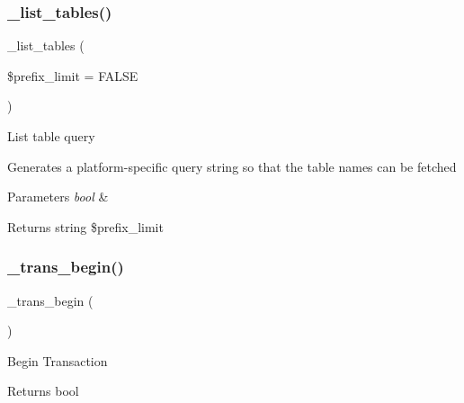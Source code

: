 \subsubsection{\texorpdfstring{\+\_\+list\+\_\+tables()}{\_list\_tables()}}
{\footnotesize\ttfamily \+\_\+list\+\_\+tables (\begin{DoxyParamCaption}\item[{}]{\$prefix\+\_\+limit = {\ttfamily FALSE} }\end{DoxyParamCaption})\hspace{0.3cm}{\ttfamily [protected]}}

List table query

Generates a platform-\/specific query string so that the table names can be fetched


\begin{DoxyParams}{Parameters}
{\em bool} & \\
\hline
\end{DoxyParams}
\begin{DoxyReturn}{Returns}
string \$prefix\+\_\+limit 
\end{DoxyReturn}
\mbox{\label{class_c_i___d_b__sqlsrv__driver_ac81ac882c1d54347d810199a15856aac}} 
\subsubsection{\texorpdfstring{\+\_\+trans\+\_\+begin()}{\_trans\_begin()}}
{\footnotesize\ttfamily \+\_\+trans\+\_\+begin (\begin{DoxyParamCaption}{ }\end{DoxyParamCaption})\hspace{0.3cm}{\ttfamily [protected]}}

Begin Transaction

\begin{DoxyReturn}{Returns}
bool 
\end{DoxyReturn}
\mbox{\label{class_c_i___d_b__sqlsrv__driver_a6fe7f373e0b11cfae23a5f41c0b35dda}} 
